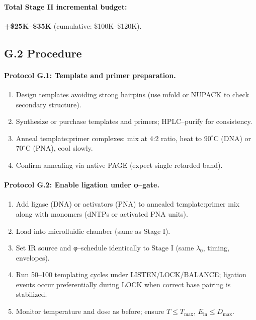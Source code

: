 \documentclass[11pt]{article}
\begin{document}
\paragraph{Total Stage II incremental budget:} \textbf{+\$25K–\$35K} (cumulative: \$100K–\$120K).

\subsection*{G.2 Procedure}

\paragraph{Protocol G.1: Template and primer preparation.}
\begin{enumerate}
\item Design templates avoiding strong hairpins (use mfold or NUPACK to check secondary structure).
\item Synthesize or purchase templates and primers; HPLC–purify for consistency.
\item Anneal template:primer complexes: mix at 4:2 ratio, heat to $90^\circ$C (DNA) or $70^\circ$C (PNA), cool slowly.
\item Confirm annealing via native PAGE (expect single retarded band).
\end{enumerate}

\paragraph{Protocol G.2: Enable ligation under φ–gate.}
\begin{enumerate}
\item Add ligase (DNA) or activators (PNA) to annealed template:primer mix along with monomers (dNTPs or activated PNA units).
\item Load into microfluidic chamber (same as Stage I).
\item Set IR source and φ–schedule identically to Stage I (same $\lambda_0$, timing, envelopes).
\item Run 50–100 templating cycles under \textsf{LISTEN/LOCK/BALANCE}; ligation events occur preferentially during \textsf{LOCK} when correct base pairing is stabilized.
\item Monitor temperature and dose as before; ensure $T\le T_{\max}$, $E_{\mathrm{in}}\le D_{\max}$.
\end{enumerate}
\end{document}
